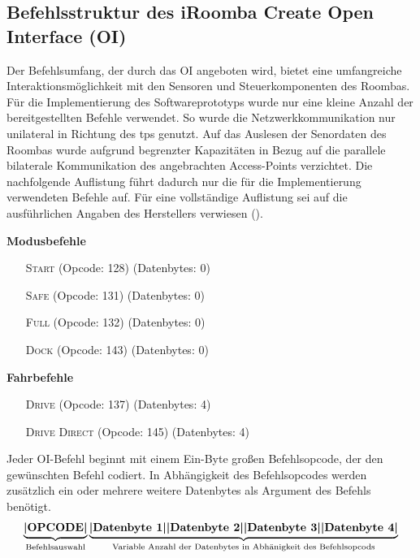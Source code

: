 \subsection{Befehlsstruktur des iRoomba Create Open Interface (OI)}
\label{subsction:befehlsstruktur}
Der Befehlsumfang, der durch das OI angeboten wird, bietet eine umfangreiche Interaktionsmöglichkeit mit den Sensoren und Steuerkomponenten des Roombas. Für die Implementierung des Softwareprototyps wurde nur eine kleine Anzahl der bereitgestellten Befehle verwendet. So wurde die Netzwerkkommunikation nur unilateral in Richtung des \acs{tps} genutzt. Auf das Auslesen der Senordaten des Roombas wurde aufgrund begrenzter Kapazitäten in Bezug auf die parallele bilaterale Kommunikation des angebrachten Access-Points verzichtet. Die nachfolgende Auflistung führt dadurch nur die für die Implementierung verwendeten Befehle auf. Für eine vollständige Auflistung sei auf die ausführlichen Angaben des Herstellers verwiesen (\vgl \cite{IRobot2010}). 
\begin{description}
\item \textbf{Modusbefehle}
\begin{itemize}
\item[\textsc{Start}] (Opcode: 128) (Datenbytes: 0)
\item[\textsc{Safe}] (Opcode: 131) (Datenbytes: 0)
\item[\textsc{Full}] (Opcode: 132) (Datenbytes: 0)
\item[\textsc{Dock}] (Opcode: 143) (Datenbytes: 0)
\end{itemize}
\item \textbf{Fahrbefehle}
\begin{itemize}
\item [\textsc{Drive}] (Opcode: 137) (Datenbytes: 4)
\item [\textsc{Drive} \textsc{Direct}] (Opcode: 145) (Datenbytes: 4)
\end{itemize}
\end{description}
Jeder OI-Befehl beginnt mit einem Ein-Byte großen Befehlsopcode, der den gewünschten Befehl codiert. In Abhängigkeit des Befehlsopcodes werden zusätzlich ein oder mehrere weitere Datenbytes als Argument des Befehls benötigt.
\begin{equation*}
\noindent \color{black} \underbrace{\textbf{|OPCODE|}}_{\substack{\text{Befehlsauswahl}}}\hfill \color{black}\underbrace{\textbf{|Datenbyte 1|}\hfill \textbf{|Datenbyte 2|} \hfill \textbf{|Datenbyte 3|}\hfill \textbf{|Datenbyte 4|}}_{\substack{\text{Variable Anzahl der Datenbytes in Abhänigkeit des Befehlsopcods}}} \hfill 
\end{equation*}

